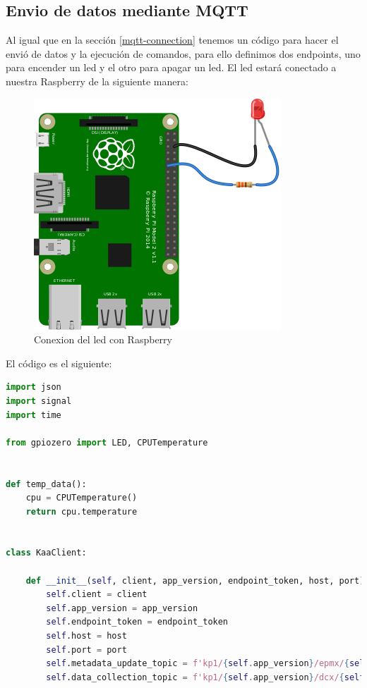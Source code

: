 {\subsection{Envio de datos mediante MQTT}

Al igual que en la sección \ref{mqtt-connection} tenemos un código para hacer el envió de datos y la ejecución de comandos, para ello definimos dos endpoints, uno para encender un led y el otro para apagar un led. El led estará conectado a nuestra Raspberry de la siguiente manera:

\begin{figure}[hb!]
    \centering
    \includegraphics[width=\linewidth]{imagenes/led_bb.png}
    \caption{Conexion del led con Raspberry \cite{raspberry-led}}
    \label{fig:figure12}
\end{figure}

El código es el siguiente:

\begin{lstlisting}[language=Python]
import json
import signal
import time

from gpiozero import LED, CPUTemperature


def temp_data():
    cpu = CPUTemperature()
    return cpu.temperature


class KaaClient:

    def __init__(self, client, app_version, endpoint_token, host, port):
        self.client = client
        self.app_version = app_version
        self.endpoint_token = endpoint_token
        self.host = host
        self.port = port
        self.metadata_update_topic = f'kp1/{self.app_version}/epmx/{self.endpoint_token}/update/keys'
        self.data_collection_topic = f'kp1/{self.app_version}/dcx/{self.endpoint_token}/json'


\end{lstlisting}}
